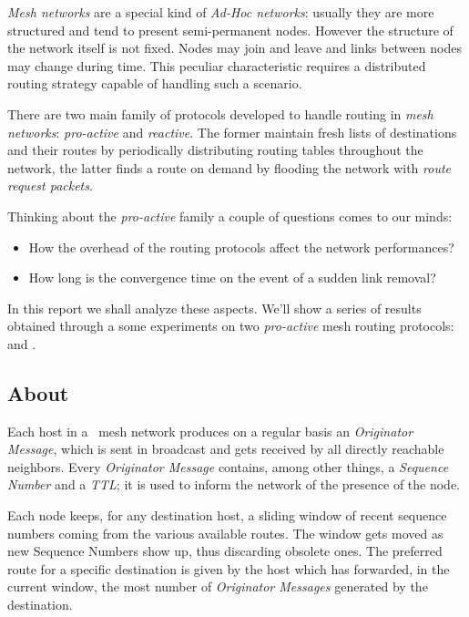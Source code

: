\emph{Mesh networks} are a special kind of \emph{Ad-Hoc networks}:
usually they are more structured and tend to present semi-permanent
nodes. However the structure of the network itself is not fixed. Nodes
may join and leave and links between nodes may change during
time. This peculiar characteristic requires a distributed routing
strategy capable of handling such a scenario.

There are two main family of protocols developed to handle routing in
\emph{mesh networks}: \emph{pro-active} and \emph{reactive}.
The former maintain fresh lists of destinations and their routes by
periodically distributing routing tables throughout the network, the
latter finds a route on demand by flooding the network with \emph{route
request packets}.

Thinking about the \emph{pro-active} family a couple of questions
comes to our minds:
\begin{itemize}
\item   How the overhead of the routing protocols affect the network
        performances?
\item   How long is the convergence time on the event of a sudden link
        removal?
\end{itemize}

In this report we shall analyze these aspects. We'll show a series of
results obtained through a some experiments on two \emph{pro-active} mesh
routing protocols: \batman\cite{bib:BATMAN} and \olsr\cite{bib:OLSR}.

\subsection{About \batman}

    Each host in a \batman\ mesh network produces on a
    regular basis an \emph{Originator Message}, which is sent in
    broadcast and gets received by all directly reachable neighbors. Every
    \emph{Originator Message} contains, among other things, a
    \emph{Sequence Number} and a \emph{TTL}; it is used to
    inform the network of the presence of the node.

    Each node keeps, for any destination host, a sliding window of
    recent sequence numbers coming from the various available routes. The
    window gets moved as new Sequence Numbers show up, thus discarding
    obsolete ones. The preferred
    route for a specific destination is given by the host which has
    forwarded, in the current window,  the most number of \emph{Originator
    Messages} generated by the destination.


